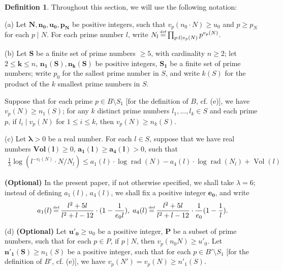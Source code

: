 \documentclass[a4paper, 12pt]{article}
\DeclareMathOperator{\defeq}{\overset{\text{\tiny{def}}}{=}}
\DeclareMathOperator{\rad}{\text{rad}}
\DeclareMathOperator{\Vol}{\text{Vol}}
\numberwithin{equation}{section}
\theoremstyle{definition}
\newtheorem{definition}[thm]{Definition}
\begin{document}
\begin{definition} \label{1-3-def: basic notation for global inequalities}
Throughout this section, we will use the following notation:

(a) Let $\boldsymbol{N, n_0, u_0, p_N}$ be positive integers, such that $v_p(n_0 \cdot N)\ge u_0$ and $p \ge p_N$ for each $p\mid N$.
For each prime number $l$, write $N_l \defeq \prod_{p:l\mid v_p(N)} p^{v_p(N)}$.

(b) Let $\boldsymbol{S}$ be a finite set of prime numbers $\ge 5$, with cardinality $n \ge 2$; 
let $2 \le \boldsymbol{k} \le n$, $\boldsymbol{n_1(S), n_k(S)}$ be positive integers, $\boldsymbol{S_1}$ be a finite set of prime numbers;
write $p_0$ for the sallest prime number in $S$, and write $k(S)$ for the product of the $k$ smallest prime numbers in $S$. 

Suppose that for each prime $p\in B\setminus S_1$ [for the definition of $B$, cf. (e)], we have $v_p(N) \ge n_1(S)$;
 for any $k$ distinct prime numbers $l_1, ..., l_k \in S$ and each prime $p$, if $l_i \mid v_p(N)$ for $1\le i\le k$, then $v_p(N) \ge n_k(S)$.

(c) Let $\boldsymbol{\lambda} > 0$ be a real number. For each $l\in S$, suppose that we have real numbers $\boldsymbol{\textbf{Vol}(l)} \ge 0$, $\boldsymbol{a_1(l)} \ge \boldsymbol{a_4(l)} > 0$, such that 
\small\begin{align} \label{1-1-eq1}
\frac{1}{\lambda}\log(l^{-v_l(N)} \cdot N/N_l  ) \le  a_1(l) \cdot \log\rad(N) - a_4(l) \cdot \log\rad(N_l) + \Vol(l)
\end{align}\normalsize

\textbf{(Optional)} In the present paper, if not otherwise specified, we shall take $\lambda = 6$; instead of defining $a_1(l)$, $a_4(l)$, we shall fix a positive integer $\boldsymbol{e_0}$, and write 
\begin{gather*}
a_1(l) \defeq \frac{l^2+5l}{l^2+l-12}\cdot  (1-\frac{1}{e_0  l}), \;
a_4(l) \defeq \frac{l^2+5l}{l^2+l-12}\cdot \frac{1}{e_0}(1- \frac{1}{l}) .
\end{gather*}


(d) \textbf{(Optional)} Let $\boldsymbol{u'_0}\ge u_0$ be a positive integer, $\boldsymbol{P}$ be a subset of prime numbers, such that for each $p\in P$, if $p\mid N$, then $v_p(n_0N)\ge u'_0$.
Let $\boldsymbol{n'_1(S)} \ge n_1(S)$ be a positive integer, such that for each $p\in B' \setminus S_1$ [for the definition of $B'$, cf. (e)], we have $v_p(N') = v_p(N) \ge n'_1(S)$.


\end{definition}
\end{document}
